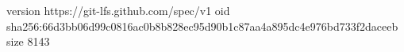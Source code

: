 version https://git-lfs.github.com/spec/v1
oid sha256:66d3bb06d99c0816ac0b8b828ec95d90b1c87aa4a895dc4e976bd733f2daceeb
size 8143
